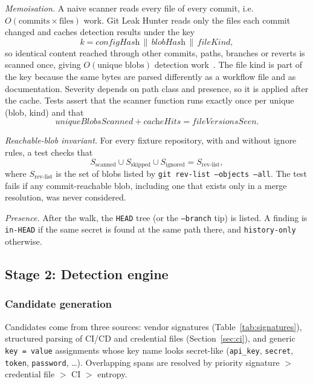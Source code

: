 \documentclass[conference]{IEEEtran}
\newcommand{\tool}{Git Leak Hunter}
\newcommand{\code}[1]{\texttt{#1}}
\begin{document}
\emph{Memoisation.} A naive scanner reads every file of every commit, i.e.\
$O(\text{commits}\times\text{files})$ work. \tool{} reads only the files each commit changed and
caches detection results under the key
\begin{equation}
k = \textit{configHash} \,\|\, \textit{blobHash} \,\|\, \textit{fileKind},
\end{equation}
so identical content reached through other commits, paths, branches or reverts is scanned once,
giving $O(\text{unique blobs})$ detection work~\cite{clrs}. The file kind is part of the key
because the same bytes are parsed differently as a workflow file and as documentation. Severity
depends on path class and presence, so it is applied after the cache. Tests assert that the
scanner function runs exactly once per unique (blob, kind) and that
\begin{equation}
\textit{uniqueBlobsScanned} + \textit{cacheHits} = \textit{fileVersionsSeen}.
\end{equation}

\emph{Reachable-blob invariant.} For every fixture repository, with and without ignore rules, a test
checks that
\begin{equation}
S_{\text{scanned}} \cup S_{\text{skipped}} \cup S_{\text{ignored}} = S_{\text{rev-list}},
\end{equation}
where $S_{\text{rev-list}}$ is the set of blobs listed by \code{git rev-list --objects --all}. The
test fails if any commit-reachable blob, including one that exists only in a merge resolution, was
never considered.

\emph{Presence.} After the walk, the \code{HEAD} tree (or the \code{--branch} tip) is listed. A
finding is \code{in-HEAD} if the same secret is found at the same path there, and
\code{history-only} otherwise.

\subsection{Stage 2: Detection engine}
\subsubsection{Candidate generation}
Candidates come from three sources: vendor signatures (Table~\ref{tab:signatures}), structured
parsing of CI/CD and credential files (Section~\ref{sec:ci}), and generic \code{key = value}
assignments whose key name looks secret-like (\code{api\_key}, \code{secret}, \code{token},
\code{password}, \ldots). Overlapping spans are resolved by priority
signature $>$ credential file $>$ CI $>$ entropy.
\end{document}
